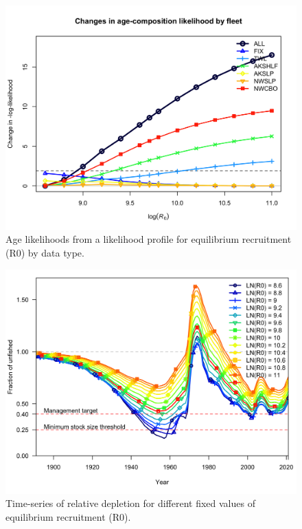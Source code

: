 \documentclass[11pt,
  english,
  a4paper,
]{article}
\begin{document}
\tagmcend\tagstructend


\begin{figure}
\centering
\includegraphics[width=1\textwidth,height=1\textheight]{figs/rprofile_plot_age.png}
\caption{Age likelihoods from a likelihood profile for equilibrium recruitment (R0) by data type.\label{fig:sens_R0_ssb}}
\end{figure}

\tagmcend\tagstructend


\begin{figure}
\centering
\includegraphics[width=1\textwidth,height=1\textheight]{figs/rprofile_plot_depl.png}
\caption{Time-series of relative depletion for different fixed values of equilibrium recruitment (R0).\label{fig:sens_R0_depl}}
\end{figure}
\end{document}
